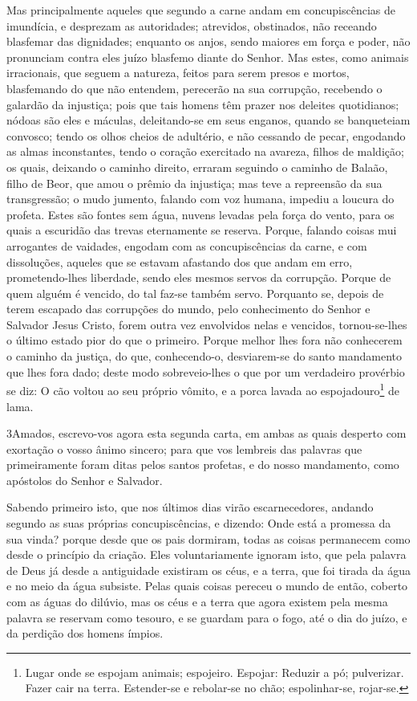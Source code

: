 Mas principalmente aqueles que segundo a carne andam em
concupiscências de imundícia, e desprezam as autoridades; atrevidos,
obstinados, não receando blasfemar das dignidades; enquanto
os anjos, sendo maiores em força e poder, não pronunciam contra eles
juízo blasfemo diante do Senhor. Mas estes, como animais
irracionais, que seguem a natureza, feitos para serem presos e
mortos, blasfemando do que não entendem, perecerão na sua corrupção,
recebendo o galardão da injustiça; pois que tais homens têm
prazer nos deleites quotidianos; nódoas são eles e máculas,
deleitando-se em seus enganos, quando se banqueteiam convosco;
tendo os olhos cheios de adultério, e não cessando de pecar,
engodando as almas inconstantes, tendo o coração exercitado na
avareza, filhos de maldição; os quais, deixando o caminho
direito, erraram seguindo o caminho de Balaão, filho de Beor, que
amou o prêmio da injustiça; mas teve a repreensão da sua
transgressão; o mudo jumento, falando com voz humana, impediu a
loucura do profeta. Estes são fontes sem água, nuvens levadas
pela força do vento, para os quais a escuridão das trevas
eternamente se reserva. Porque, falando coisas mui arrogantes
de vaidades, engodam com as concupiscências da carne, e com
dissoluções, aqueles que se estavam afastando dos que andam em erro,
prometendo-lhes liberdade, sendo eles mesmos servos da
corrupção. Porque de quem alguém é vencido, do tal faz-se também
servo. Porquanto se, depois de terem escapado das corrupções
do mundo, pelo conhecimento do Senhor e Salvador Jesus Cristo, forem
outra vez envolvidos nelas e vencidos, tornou-se-lhes o último
estado pior do que o primeiro. Porque melhor lhes fora não
conhecerem o caminho da justiça, do que, conhecendo-o, desviarem-se
do santo mandamento que lhes fora dado; deste modo
sobreveio-lhes o que por um verdadeiro provérbio se diz: O cão
voltou ao seu próprio vômito, e a porca lavada ao
espojadouro\footnote{Lugar onde se espojam animais; espojeiro.
Espojar: Reduzir a pó; pulverizar. Fazer cair na terra. Estender-se
e rebolar-se no chão; espolinhar-se, rojar-se.} de lama.

\medskip

\lettrine{3} Amados, escrevo-vos agora esta segunda carta, em
ambas as quais desperto com exortação o vosso ânimo sincero;
para que vos lembreis das palavras que primeiramente foram ditas
pelos santos profetas, e do nosso mandamento, como apóstolos do
Senhor e Salvador.

Sabendo primeiro isto, que nos últimos dias virão escarnecedores,
andando segundo as suas próprias concupiscências, e dizendo:
Onde está a promessa da sua vinda? porque desde que os pais
dormiram, todas as coisas permanecem como desde o princípio da
criação. Eles voluntariamente ignoram isto, que pela palavra de
Deus já desde a antiguidade existiram os céus, e a terra, que foi
tirada da água e no meio da água subsiste. Pelas quais coisas
pereceu o mundo de então, coberto com as águas do dilúvio, mas
os céus e a terra que agora existem pela mesma palavra se reservam
como tesouro, e se guardam para o fogo, até o dia do juízo, e da
perdição dos homens ímpios.

